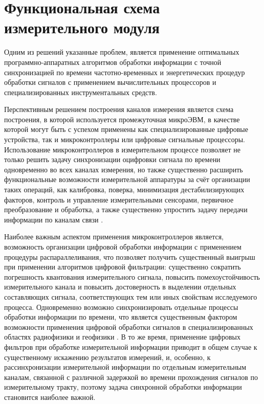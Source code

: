 \documentclass[a4paper, 14pt, titlepage]{extarticle}
\begin{document}
  \section{Функциональная схема измерительного модуля}

  Одним из решений указанные проблем, является применение оптимальных программно-аппаратных
  алгоритмов обработки информации с точной синхронизацией по времени частотно-временных и
  энергетических процедур обработки сигналов с применением вычислительных процессоров и
  специализированных инструментальных средств.

  Перспективным решением построения каналов измерения является схема построения, в которой
  используется промежуточная микроЭВМ, в качестве которой могут быть с успехом применены как
  специализированные цифровые устройства, так и микроконтроллеры или цифровые сигнальные процессоры.
  Использование микроконтроллеров в измерительном процессе позволяет не только решить задачу
  синхронизации оцифровки сигнала по времени одновременно во всех каналах измерения, но также
  существенно расширить функциональные возможности измерительной аппаратуры за счёт организации
  таких операций, как калибровка, поверка, минимизация дестабилизирующих факторов, контроль и
  управление измерительными сенсорами, первичное преобразование и обработка, а также существенно
  упростить задачу передачи информации по каналам связи \cite{klaassen-methods}.

  Наиболее важным аспектом применения микроконтроллеров является, возможность организации цифровой
  обработки информации с применением процедуры распараллеливания, что позволяет получить
  существенный выигрыш при применении алгоритмов цифровой фильтрации: существенно сократить
  погрешность квантования измерительного сигнала, повысить помехоустойчивость измерительного канала
  и повысить достоверность в выделении отдельных составляющих сигнала, соответствующих тем или иных
  свойствам исследуемого процесса. Одновременно возможно синхронизировать отдельные процессы
  обработки информации по времени, что является существенным фактором возможности применения
  цифровой обработки сигналов в специализированных областях радиофизики и геофизики
  \cite{rathore-digital}. В то же время, применение цифровых фильтров при обработке измерительной
  информации приводит в общем случае к существенному искажению результатов измерений, и, особенно, к
  рассинхронизации измерительной информации по отдельным измерительным каналам, связанной с
  различной задержкой во времени прохождения сигналов по измерительному тракту, поэтому задача
  синхронной обработки информации становится наиболее важной.
\end{document}

